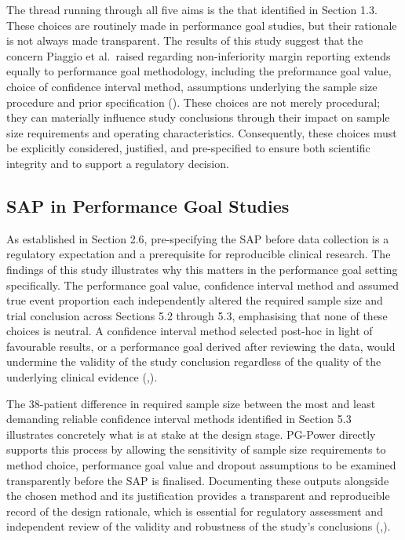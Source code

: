 \documentclass{article}
\begin{document}
The thread running through all five aims is the that identified in
Section 1.3. These choices are routinely made in performance goal
studies, but their rationale is not always made transparent. The results
of this study suggest that the concern Piaggio et al.~raised regarding
non-inferiority margin reporting extends equally to performance goal
methodology, including the preformance goal value, choice of confidence
interval method, assumptions underlying the sample size procedure and
prior specification (). These
choices are not merely procedural; they can materially influence study
conclusions through their impact on sample size requirements and
operating characteristics. Consequently, these choices must be
explicitly considered, justified, and pre-specified to ensure both
scientific integrity and to support a regulatory decision.

\subsection{SAP in Performance Goal
Studies}\label{sap-in-performance-goal-studies}

As established in Section 2.6, pre-specifying the SAP before data
collection is a regulatory expectation and a prerequisite for
reproducible clinical research. The findings of this study illustrates
why this matters in the performance goal setting specifically. The
performance goal value, confidence interval method and assumed true
event proportion each independently altered the required sample size and
trial conclusion across Sections 5.2 through 5.3, emphasising that none
of these choices is neutral. A confidence interval method selected
post-hoc in light of favourable results, or a performance goal derived
after reviewing the data, would undermine the validity of the study
conclusion regardless of the quality of the underlying clinical evidence
(,).

The 38-patient difference in required sample size between the most and
least demanding reliable confidence interval methods identified in
Section 5.3 illustrates concretely what is at stake at the design stage.
PG-Power directly supports this process by allowing the sensitivity of
sample size requirements to method choice, performance goal value and
dropout assumptions to be examined transparently before the SAP is
finalised. Documenting these outputs alongside the chosen method and its
justification provides a transparent and reproducible record of the
design rationale, which is essential for regulatory assessment and
independent review of the validity and robustness of the study's
conclusions
(,).
\end{document}

